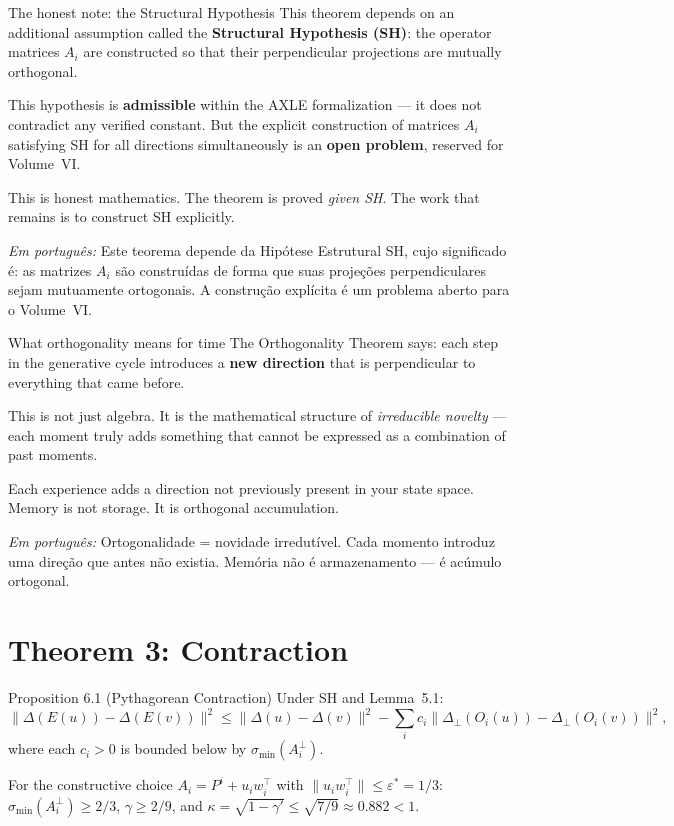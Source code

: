 \documentclass[12pt, openright]{book}
\theoremstyle{definition}
\theoremstyle{remark}
\begin{document}
\begin{studentbox}{The honest note: the Structural Hypothesis}
This theorem depends on an additional assumption called the
\textbf{Structural Hypothesis (SH)}: the operator matrices $A_i$
are constructed so that their perpendicular projections are
mutually orthogonal.

This hypothesis is \textbf{admissible} within the AXLE
formalization --- it does not contradict any verified constant.
But the explicit construction of matrices $A_i$ satisfying SH
for all directions simultaneously is an \textbf{open problem},
reserved for Volume~VI.

This is honest mathematics. The theorem is proved \textit{given SH}.
The work that remains is to construct SH explicitly.

\textit{Em português:}
Este teorema depende da Hipótese Estrutural SH, cujo significado é:
as matrizes $A_i$ são construídas de forma que suas projeções
perpendiculares sejam mutuamente ortogonais. A construção explícita
é um problema aberto para o Volume~VI.
\end{studentbox}

\begin{studentbox}{What orthogonality means for time}
The Orthogonality Theorem says: each step in the generative
cycle introduces a \textbf{new direction} that is perpendicular
to everything that came before.

This is not just algebra. It is the mathematical structure of
\textit{irreducible novelty} --- each moment truly adds something
that cannot be expressed as a combination of past moments.

Each experience adds a direction not previously present
in your state space. Memory is not storage. It is orthogonal accumulation.

\textit{Em português:}
Ortogonalidade = novidade irredutível.
Cada momento introduz uma direção que antes não existia.
Memória não é armazenamento --- é acúmulo ortogonal.
\end{studentbox}

\section{Theorem 3: Contraction}

\begin{formalbox}{Proposition 6.1 (Pythagorean Contraction)}
Under SH and Lemma~5.1:
\[
\|\Delta(E(u)) - \Delta(E(v))\|^2 \leq
\|\Delta(u) - \Delta(v)\|^2 - \sum_i c_i \|\Delta_\perp(O_i(u)) - \Delta_\perp(O_i(v))\|^2,
\]
where each $c_i > 0$ is bounded below by $\sigma_{\min}(A_i^\perp)$.

For the constructive choice $A_i = P^i + u_i w_i^\top$ with $\|u_i w_i^\top\| \leq \varepsilon^* = 1/3$:
$\sigma_{\min}(A_i^\perp) \geq 2/3$, $\gamma \geq 2/9$, and
$\kappa = \sqrt{1-\gamma'} \leq \sqrt{7/9} \approx 0.882 < 1$.
\end{formalbox}
\end{document}
